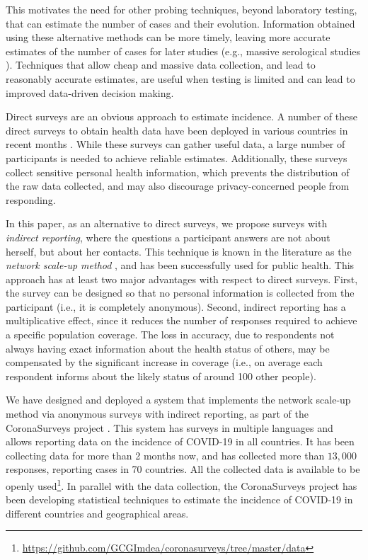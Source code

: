 \documentclass{article}
\begin{document}
This motivates the need for other probing techniques, beyond laboratory testing, that can estimate  the number of cases and their evolution. Information obtained using these alternative methods can be more timely, leaving more accurate estimates of the number of cases for later studies  (e.g.,  massive serological studies \cite{yang2012serological}).  Techniques that allow cheap and massive data collection, and lead to reasonably accurate estimates, 
are useful when testing is limited and can lead to improved data-driven decision making. 

Direct surveys are an obvious approach to estimate incidence. A number of these direct surveys to obtain health data have been deployed in various countries in recent months \cite{linares1920estimando,DBLP:journals/corr/abs-2004-01014,FB-survey}. While these surveys can gather  useful data, a large number of participants is needed to achieve reliable estimates. Additionally, these surveys collect sensitive personal health information, which prevents the distribution of the raw data collected, and may also discourage privacy-concerned people from responding.

In this paper, as an alternative to direct surveys, we propose surveys with \textit{indirect reporting}, where the questions a participant answers are not about herself, but about her contacts. 
This technique is known in the literature as the \emph{network scale-up method} \cite{bernard1991estimating,bernard2010counting}, and has been successfully used for public health.
This approach has at least two major advantages with respect to direct surveys. First, the survey can be designed so that no personal information is collected from the participant (i.e., it is completely anonymous). Second, indirect reporting has a multiplicative effect, since it reduces the number of responses required to achieve a specific population coverage. The loss in accuracy, due to respondents not always having exact information about the health status of others, may be compensated by the significant increase in coverage (i.e., on average each respondent informs about the likely status of around 100 other people).   

We have designed and deployed a system that implements the network scale-up method via anonymous surveys with indirect reporting, as part of the CoronaSurveys project \cite{CoronaSurveys}. This system has surveys in multiple languages and allows reporting data on the incidence of COVID-19 in all countries. It has been collecting data for more than 2 months now, and has collected more than $13,000$ responses, reporting cases in 70 countries. All the collected data is available to be openly used\footnote{\url{https://github.com/GCGImdea/coronasurveys/tree/master/data}}. In parallel with the data collection, the CoronaSurveys project has been developing statistical techniques to estimate the incidence of COVID-19 in different countries and geographical areas.
\end{document}
